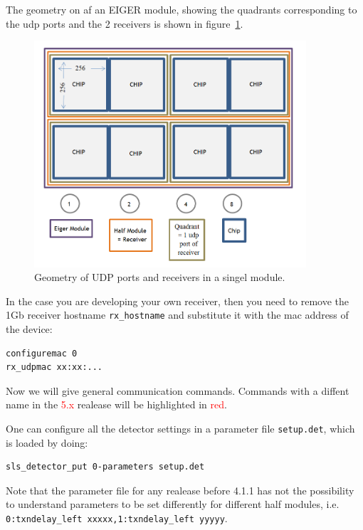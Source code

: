 \documentclass{article}
\begin{document}
The geometry on af an EIGER module, showing the quadrants corresponding to the udp ports and the 2 receivers is shown in figure~\ref{fig:eigerports}.
\begin{figure}[t]
\begin{center}
\includegraphics[width=0.9\textwidth]{Eiger-Chips}
\end{center}
\caption{Geometry of UDP ports and receivers in a singel module.}
\label{fig:eigerports}
\end{figure}

In the case you are developing your own receiver, then you need to remove the 1Gb receiver hostname {\tt{rx\_hostname}} and substitute it with the mac address of the device:
\begin{verbatim}
configuremac 0
rx_udpmac xx:xx:...
\end{verbatim}

Now we will give general communication commands. Commands with a diffent name in the \textcolor{red}{5.x} realease will be highlighted in \textcolor{red}{red}.

One can configure all the detector settings in a parameter file {\tt{setup.det}}, which is loaded by doing:
\begin{verbatim}
sls_detector_put 0-parameters setup.det
\end{verbatim}
Note that the parameter file for any realease before 4.1.1 has not the possibility to understand parameters to be set differently for different half modules, i.e.  {\tt{0:txndelay\_left xxxxx},\tt{1:txndelay\_left yyyyy}}. 
\end{document}
